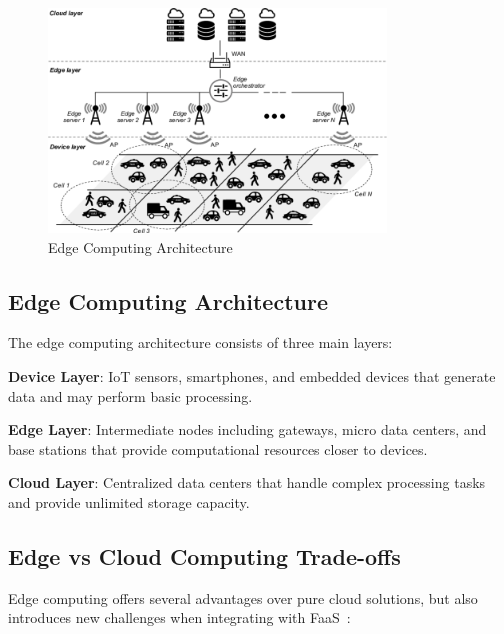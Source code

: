 \begin{figure}[h]
    \centering
    \includegraphics[width=0.8\textwidth]{Assets/Architecture-of-edge-computing.png}
    \caption{\small Edge Computing Architecture ~\cite{belcastro2023edge}}
    \label{fig:edge_architecture}
\end{figure}

\subsection{Edge Computing Architecture}

The edge computing architecture consists of three main layers:

\textbf{Device Layer}: IoT sensors, smartphones, and embedded devices that generate data and may perform basic processing.

\textbf{Edge Layer}: Intermediate nodes including gateways, micro data centers, and base stations that provide computational resources closer to devices.

\textbf{Cloud Layer}: Centralized data centers that handle complex processing tasks and provide unlimited storage capacity.

\subsection{Edge vs Cloud Computing Trade-offs}

Edge computing offers several advantages over pure cloud solutions, but also introduces new challenges when integrating with FaaS~\cite{jin2019when}:

